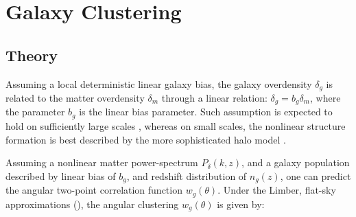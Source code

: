 \documentclass[fleqn,usenatbib,useAMS]{mnras}
\begin{document}



\section{Galaxy Clustering}\label{sec:clustering}

\subsection{Theory}

Assuming a local deterministic linear galaxy bias, the galaxy overdensity $\delta_g$ is related to the matter overdensity $\delta_m$ through a linear relation: $\delta_g = b_g \delta_m$, where the parameter $b_g$ is the linear bias parameter. Such assumption is expected to hold on sufficiently large scales \citep[e.g.][]{dvornik2018}, whereas on small scales, the nonlinear structure formation is best described by the more sophisticated halo model \citep[e.g. ][]{hand2017,vakili_hahn}.

Assuming a nonlinear matter power-spectrum $P_{\delta}(k,z)$, and a galaxy population described by linear bias of $b_g$, and redshift distribution of $n_g(z)$, one can predict the angular two-point correlation function $w_{g}(\theta)$. Under the Limber, flat-sky approximations (\citealt{kilbinger2017, kitching2017}), the angular clustering $w_g(\theta)$ is given by:
\end{document}
